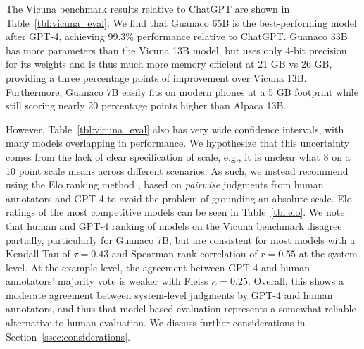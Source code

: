 The Vicuna benchmark \cite{vicuna2023} results relative to ChatGPT are shown in Table~\ref{tbl:vicuna_eval}. We find that {Guanaco} 65B is the best-performing model after GPT-4, achieving 99.3\% performance relative to ChatGPT. {Guanaco} 33B has more parameters than the Vicuna 13B model, but uses only 4-bit precision for its weights and is thus much more memory efficient at 21 GB vs 26 GB, providing a three percentage points of improvement over Vicuna 13B. Furthermore, {Guanaco} 7B easily fits on modern phones at a 5 GB footprint while still scoring nearly 20 percentage points higher than Alpaca 13B. 

However, Table~\ref{tbl:vicuna_eval} also has very wide confidence intervals, with many models overlapping in performance. We hypothesize that this uncertainty comes from the lack of clear specification of scale, e.g., it is unclear what 8 on a 10 point scale means across different scenarios. As such, we instead recommend using the Elo ranking method \citep{elo1967proposed}, based on \textit{pairwise} judgments from human annotators and GPT-4 to avoid the problem of grounding an absolute scale. Elo ratings of the most competitive models can be seen in Table~\ref{tbl:elo}. We note that human and GPT-4 ranking of models on the Vicuna benchmark disagree partially, particularly for Guanaco 7B, but are consistent for most models with a Kendall Tau of $\tau=0.43$ and Spearman rank correlation of $r=0.55$ at the system level. At the example level, the agreement between GPT-4 and human annotators' majority vote is weaker with Fleiss $\kappa=0.25$. Overall, this shows a moderate agreement between system-level judgments by GPT-4 and human annotators, and thus that model-based evaluation represents a somewhat reliable alternative to human evaluation. We discuss further considerations in Section~\ref{ssec:considerations}.

